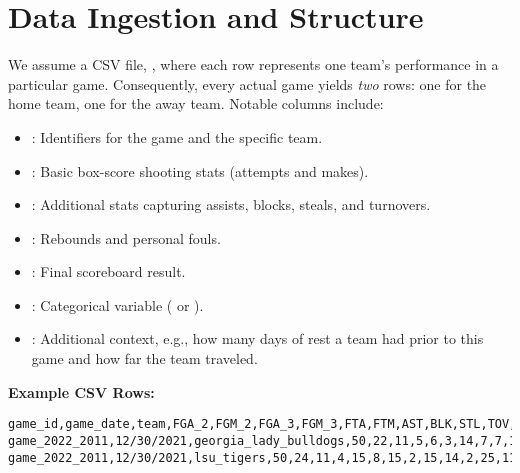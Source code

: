 \documentclass[12pt]{article}
\begin{document}
\section{Data Ingestion and Structure}
We assume a CSV file, , where each row represents one team's performance in a particular game. Consequently, every actual game yields \emph{two} rows: one for the home team, one for the away team. Notable columns include:

\begin{itemize}[noitemsep]
    \item {}: Identifiers for the game and the specific team.
    \item {}: Basic box-score shooting stats (attempts and makes).
    \item {}: Additional stats capturing assists, blocks, steals, and turnovers.
    \item {}: Rebounds and personal fouls.
    \item {}: Final scoreboard result.
    \item {}: Categorical variable ( or ).
    \item {}: Additional context, e.g., how many days of rest a team had prior to this game and how far the team traveled.
\end{itemize}

\noindent
\textbf{Example CSV Rows:}
\begin{verbatim}
game_id,game_date,team,FGA_2,FGM_2,FGA_3,FGM_3,FTA,FTM,AST,BLK,STL,TOV,TOV_team,DREB,OREB,F_tech,F_personal,team_score,opponent_team_score,largest_lead,notD1_incomplete,OT_length_min_tot,rest_days,attendance,tz_dif_H_E,prev_game_dist,home_away,home_away_NS,travel_dist
game_2022_2011,12/30/2021,georgia_lady_bulldogs,50,22,11,5,6,3,14,7,7,18,0,25,11,0,18,62,68,1.0,False,,9.0,3241.0,0.0,0.0,home,1,0.0
game_2022_2011,12/30/2021,lsu_tigers,50,24,11,4,15,8,15,2,15,14,2,25,11,0,7,68,62,14.0,False,,3.0,3241.0,0.0,824.0,away,-1,824.0
\end{verbatim}
\end{document}
